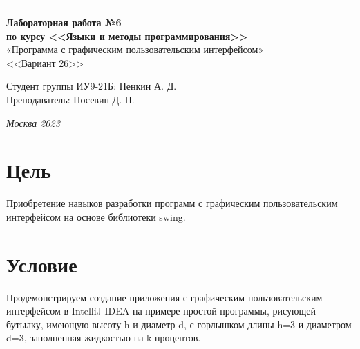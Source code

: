 ﻿\documentclass[a4paper, 12pt]{extarticle}
\begin{document}
\begin{titlepage}
\vspace*{-16pt}
\hspace{30pt}\rule{0.866\textwidth}{0.4pt}
  
\vspace{6em}

\begin{center}
\Large {\bf Лабораторная работа №6} \\ 
\large {\bf по курсу <<Языки и методы программирования>>} \\ 
\large «Программа с графическим пользовательским интерфейсом» \\
\large <<Вариант 26>>
\end{center}\normalsize

\vspace{15em}


\begin{flushright}
  {Студент группы ИУ9-21Б: Пенкин А. Д.\hspace*{15pt} \\
  \vspace{2ex}
  Преподаватель: Посевин Д. П.\hspace*{15pt}}
\end{flushright}

\bigskip

\vfill
 \vspace{7em}

\begin{center}
\textsl{Москва 2023}
\end{center}
\end{titlepage}

\renewcommand{\ttdefault}{pcr}

\setlength{\tabcolsep}{3pt}
\newpage
\setcounter{page}{2}

\section{Цель}\label{Sect::task}
\par
Приобретение навыков разработки программ с графическим пользовательским интерфейсом на основе библиотеки swing. 
\section{Условие}
\par
Продемонстрируем создание приложения с графическим пользовательским интерфейсом в IntelliJ IDEA на примере простой программы, рисующей бутылку, имеющую высоту h и диаметр d, с горлышком длины h=3 и диаметром d=3, заполненная жидкостью на k процентов.
\end{document}
